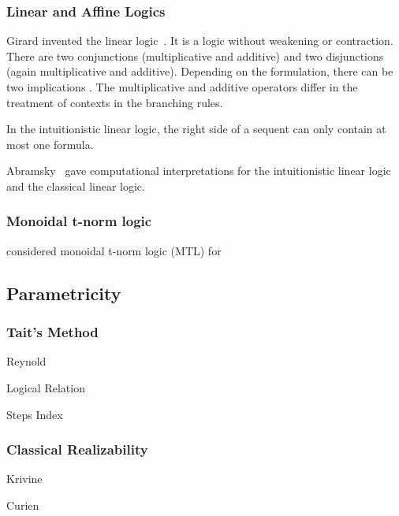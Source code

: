 \subsubsection{Linear and Affine Logics}

Girard invented the linear logic~\citep{girard1987}.  It is a logic
without weakening or contraction.  There are two conjunctions
(multiplicative and additive) and two
disjunctions (again multiplicative and additive).
Depending on the formulation, there can be two
implications .
The multiplicative and additive operators differ in
the treatment of contexts in the branching rules.

In the intuitionistic linear logic, the right side of a sequent can only
contain at most one formula.

Abramsky~\citep{abramsky1993computational} gave computational
interpretations for the intuitionistic linear logic and the classical linear logic.


\subsubsection{Monoidal t-norm logic}

\citet{Esteva2001271} considered monoidal t-norm logic (MTL) for


\subsection{Parametricity}

\subsubsection{Tait's Method}

Reynold

Logical Relation

Steps Index

\subsubsection{Classical Realizability}

Krivine

Curien

